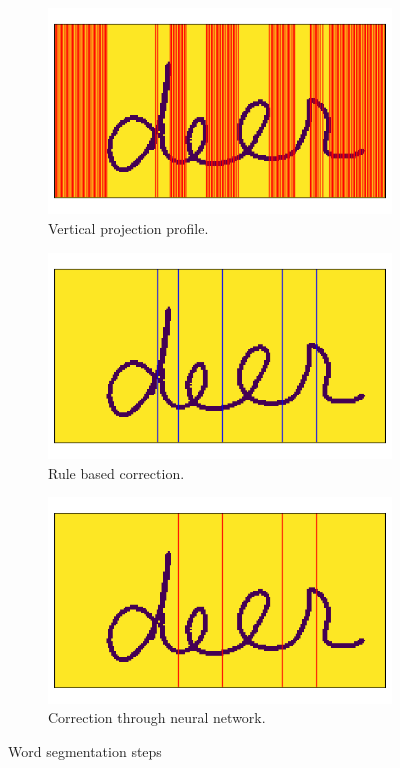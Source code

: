 \documentclass{article}
\begin{document}
\begin{figure}
    \begin{subfigure}{\linewidth}
    \centering
    \includegraphics[width=.7\linewidth]{images/vpp}
    \vspace{-5px}
    \caption*{Vertical projection profile.}
    \end{subfigure}
    \begin{subfigure}{\linewidth}
    \centering
    \includegraphics[width=.7\linewidth]{images/rules}
    \vspace{-5px}
    \caption*{Rule based correction.}
    \end{subfigure}
    \begin{subfigure}{\linewidth}
    \centering
    \includegraphics[width=.7\linewidth]{images/nn}
    \vspace{-5px}
    \caption*{Correction through neural network.}
    \end{subfigure}
    \caption{Word segmentation steps}
    \label{fig:char_segm}
\end{figure}
\end{document}
